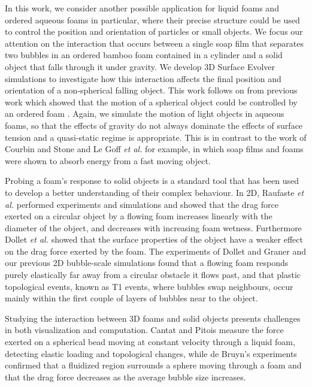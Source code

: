 \documentclass[preprint]{revtex4-1}
\begin{document}
In this work, we consider another possible application for liquid foams and ordered aqueous foams in particular, where their precise structure could be used to control the position and orientation of particles or small objects. We focus our attention on the interaction that occurs between a single soap film that separates two bubbles in an ordered bamboo foam contained in a cylinder and a solid object that falls through it under gravity. We develop 3D Surface Evolver \cite{Brakke} simulations to investigate how this interaction affects the final position and orientation of a non-spherical falling object. This work follows on from previous work which showed that the motion of a spherical object could be controlled by an ordered foam \cite{Davies12}. Again, we simulate the motion of light objects in aqueous foams, so that the effects of gravity do not always dominate the effects of surface tension and a quasi-static regime is appropriate. This is in contrast to the work of Courbin and Stone \cite{Courbin06} and Le Goff \textit{et al.} \cite{LeGoff08} for example, in which soap films and foams were shown to absorb energy from a fast moving object.


Probing a foam's response to solid objects is a standard tool that has been used to develop a better understanding of their complex behaviour. In 2D, Raufaste \textit{et al.} \cite{Raufaste07} performed experiments and simulations and showed that the drag force exerted on a circular object by a flowing foam increases linearly with the diameter of the object, and decreases with increasing foam wetness. Furthermore Dollet \textit{et al.} \cite{Dolletdrag05} showed that the surface properties of the object have a weaker effect on the drag force exerted by the foam. The experiments of Dollet and Graner \cite{DolletGraner07} and our previous 2D bubble-scale simulations \cite{Davies08} found that a flowing foam responds purely elastically far away from a circular obstacle it flows past, and that plastic topological events, known as T1 events, where bubbles swap neighbours, occur mainly within the first couple of layers of bubbles near to the object. 



Studying the interaction between 3D foams and solid objects presents challenges in both visualization and computation. Cantat and Pitois \cite{Cantat05,Cantat06}  measure the force exerted on a spherical bead moving at constant velocity through a liquid foam, detecting elastic loading and topological changes, while de Bruyn's experiments \cite{Bruyn04,Bruyn05} confirmed that a fluidized region surrounds a sphere moving through a foam and that the drag force decreases as the average bubble size increases. 
\end{document}
